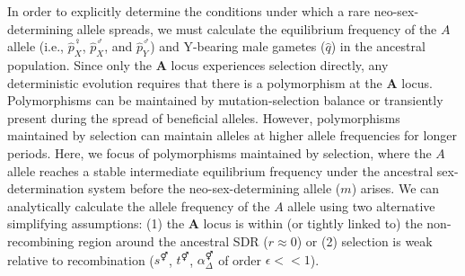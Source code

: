 \documentclass[12pt]{article}
\begin{document}
In order to explicitly determine the conditions under which a rare neo-sex-determining allele spreads, we must calculate the equilibrium frequency of the $A$ allele (i.e., $\hat{p}^\female_X$, $\hat{p}^\male_X$, and $\hat{p}^\male_Y$) and Y-bearing male gametes ($\hat{q}$) in the ancestral population. 
Since only the \textbf{A} locus experiences selection directly, any deterministic evolution requires that there is a polymorphism at the \textbf{A} locus. 
Polymorphisms can be maintained by mutation-selection balance or transiently present during the spread of beneficial alleles. However, polymorphisms maintained by selection can maintain alleles at higher allele frequencies for longer periods. 
Here, we focus of polymorphisms maintained by selection, where the $A$ allele reaches a stable intermediate equilibrium frequency under the ancestral sex-determination system before the neo-sex-determining allele ($m$) arises. 
We can analytically calculate the allele frequency of the $A$ allele using two alternative simplifying assumptions: 
(1) the \textbf{A} locus is within (or tightly linked to) the non-recombining region around the ancestral SDR ($r \approx 0$) or (2) selection is weak relative to recombination ($s^\Hermaphrodite$, $t^\Hermaphrodite$, $\alpha_{\Delta}^\Hermaphrodite$ of order $\epsilon<<1$). 

\end{document}

